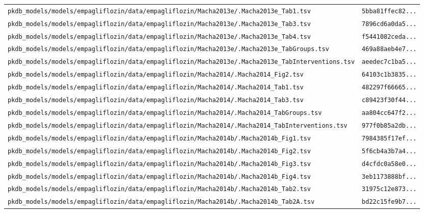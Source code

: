 \begin{longtable}{ll}
\texttt{pkdb\_models/models/empagliflozin/data/empagliflozin/Macha2013e/.Macha2013e\_Tab1.tsv} & \texttt{5bba81ffec82...} \\
\texttt{pkdb\_models/models/empagliflozin/data/empagliflozin/Macha2013e/.Macha2013e\_Tab3.tsv} & \texttt{7896cd6a0da5...} \\
\texttt{pkdb\_models/models/empagliflozin/data/empagliflozin/Macha2013e/.Macha2013e\_Tab4.tsv} & \texttt{f5441082ceda...} \\
\texttt{pkdb\_models/models/empagliflozin/data/empagliflozin/Macha2013e/.Macha2013e\_TabGroups.tsv} & \texttt{469a88aeb4e7...} \\
\texttt{pkdb\_models/models/empagliflozin/data/empagliflozin/Macha2013e/.Macha2013e\_TabInterventions.tsv} & \texttt{aeedec7c1ba5...} \\
\texttt{pkdb\_models/models/empagliflozin/data/empagliflozin/Macha2014/.Macha2014\_Fig2.tsv} & \texttt{64103c1b3835...} \\
\texttt{pkdb\_models/models/empagliflozin/data/empagliflozin/Macha2014/.Macha2014\_Tab1.tsv} & \texttt{482297f66665...} \\
\texttt{pkdb\_models/models/empagliflozin/data/empagliflozin/Macha2014/.Macha2014\_Tab3.tsv} & \texttt{c89423f30f44...} \\
\texttt{pkdb\_models/models/empagliflozin/data/empagliflozin/Macha2014/.Macha2014\_TabGroups.tsv} & \texttt{aa804cc647f2...} \\
\texttt{pkdb\_models/models/empagliflozin/data/empagliflozin/Macha2014/.Macha2014\_TabInterventions.tsv} & \texttt{977f0b85a2db...} \\
\texttt{pkdb\_models/models/empagliflozin/data/empagliflozin/Macha2014b/.Macha2014b\_Fig1.tsv} & \texttt{7984385f17ef...} \\
\texttt{pkdb\_models/models/empagliflozin/data/empagliflozin/Macha2014b/.Macha2014b\_Fig2.tsv} & \texttt{5f6cb4a3b7a4...} \\
\texttt{pkdb\_models/models/empagliflozin/data/empagliflozin/Macha2014b/.Macha2014b\_Fig3.tsv} & \texttt{d4cfdc0a58e0...} \\
\texttt{pkdb\_models/models/empagliflozin/data/empagliflozin/Macha2014b/.Macha2014b\_Fig4.tsv} & \texttt{3eb1173888bf...} \\
\texttt{pkdb\_models/models/empagliflozin/data/empagliflozin/Macha2014b/.Macha2014b\_Tab2.tsv} & \texttt{31975c12e873...} \\
\texttt{pkdb\_models/models/empagliflozin/data/empagliflozin/Macha2014b/.Macha2014b\_Tab2A.tsv} & \texttt{bd22c15fe9b7...} \\

\end{longtable}
